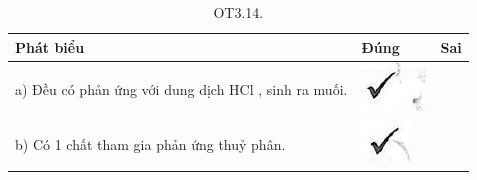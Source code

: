 \documentclass[10pt]{article}
\begin{document}
\begin{table}[h]
\begin{center}
\captionsetup{labelformat=empty}
\caption{OT3.14.}
\begin{tabular}{|l|l|l|}
\hline
Phát biểu & Đúng & Sai \\
\hline
a) Đều có phản ứng với dung dịch HCl , sinh ra muối. & \includegraphics[max width=\textwidth]{2025_10_23_b4e16b74380d0f7e7700g-057}
 &  \\
\hline
b) Có 1 chất tham gia phản ứng thuỷ phân. & \includegraphics[max width=\textwidth]{2025_10_23_b4e16b74380d0f7e7700g-057(2)}
 &  \\

\end{tabular}
\end{center}
\end{table}
\end{document}

